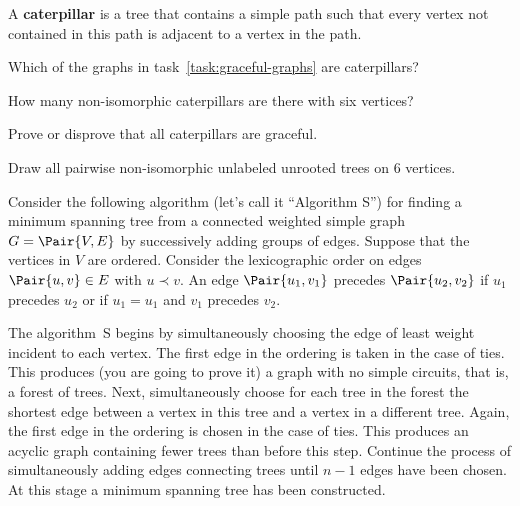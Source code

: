 \documentclass[a4paper,12pt]{article}
\begin{document}
\begin{tasks}
\begin{multicols}{2}
\begin{subtasks}
        \item {}
    \end{subtasks}
    \end{multicols}


    \item A \textbf{caterpillar} is a tree that contains a simple path such that every vertex not contained in this path is adjacent to a vertex in the path.

    \begin{subtasks}
        \item Which of the graphs in task~\ref{task:graceful-graphs} are caterpillars?
        \item How many non-isomorphic caterpillars are there with six vertices?
        \item Prove or disprove that all caterpillars are graceful.
    \end{subtasks}


    \item Draw all pairwise non-isomorphic unlabeled unrooted trees on 6 vertices.


    \item Consider the following algorithm (let's call it \enquote{Algorithm S}) for finding a minimum spanning tree from a connected weighted simple graph $G = \Pair{V, E}$ by successively adding groups of edges.
    Suppose that the vertices in $V$ are ordered.
    Consider the lexicographic order on edges $\Pair{u, v} \in E$ with $u \prec v$.
    An edge $\Pair{u_1, v_1}$ precedes $\Pair{u_2, v_2}$ if $u_1$ precedes $u_2$ or if $u_1 = u_1$ and $v_1$ precedes $v_2$.

    The algorithm~S begins by simultaneously choosing the edge of least weight incident to each vertex.
    The first edge in the ordering is taken in the case of ties.
    This produces (you are going to prove it) a graph with no simple circuits, that is, a forest of trees.
    Next, simultaneously choose for each tree in the forest the shortest edge between a vertex in this tree and a vertex in a different tree.
    Again, the first edge in the ordering is chosen in the case of ties.
    This produces an acyclic graph containing fewer trees than before this step.
    Continue the process of simultaneously adding edges connecting trees until $n - 1$ edges have been chosen.
    At this stage a minimum spanning tree has been constructed.


\end{tasks}
\end{document}
